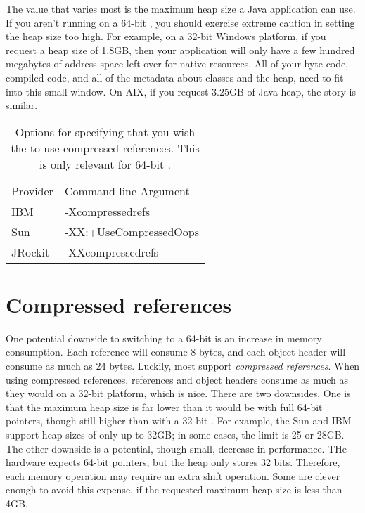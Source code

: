 The value that varies most is the maximum heap size a Java application can use.
If you aren't running on a 64-bit \jre, you should exercise extreme caution in
setting the heap size too high. For example, on a 32-bit Windows platform, if
you request a heap size of 1.8GB, then your application will only have a few
hundred megabytes  of address space left over for native resources. All of your
byte code, compiled code, and all of the \jres metadata about classes and the
heap, need to fit into this small window. On AIX, if you request 3.25GB of Java
heap, the story is similar.

\begin{wraptable}{r}{0.5\textwidth}
\centering
\begin{tabular}{ll}
\toprule
Provider & Command-line Argument \\
\cmidrule(r){1-1} \cmidrule(r){2-2}
IBM & -Xcompressedrefs \\
Sun & -XX:+UseCompressedOops \\
JRockit & -XXcompressedrefs \\
\bottomrule
\end{tabular}
\caption{Options for specifying that you wish the \jre to use compressed references. This is only relevant for 64-bit \jres.}
\end{wraptable}

\section{Compressed references}

One potential downside to switching to a 64-bit \jre is an increase in memory
consumption. Each reference will consume 8 bytes, and each object header will
consume as much as 24 bytes. Luckily, most \jres support \emph{compressed
references}. When using compressed references, references and object headers
consume as much as they would on a 32-bit platform, which is nice. There are two
downsides. One is that the maximum heap size is far lower than it would be with
full 64-bit pointers, though still higher than with a 32-bit \jre. For example,
the Sun and IBM \javasix \jres support heap sizes of only up to 32GB; in some
cases, the limit is 25 or 28GB. The other downside is a potential, though small,
decrease in performance. THe hardware expects 64-bit pointers, but the heap only
stores 32 bits. Therefore, each memory operation may require an extra shift
operation. Some \jres are clever enough to avoid this expense, if the requested
maximum heap size is less than 4GB.

